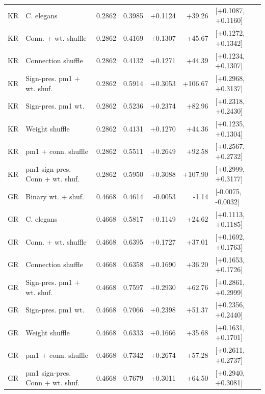 \begin{tabular}{llrrrrl}
KR & C. elegans & 0.2862 & 0.3985 & +0.1124 & +39.26 & [+0.1087, +0.1160] \\
KR & Conn. + wt. shuffle & 0.2862 & 0.4169 & +0.1307 & +45.67 & [+0.1272, +0.1342] \\
KR & Connection shuffle & 0.2862 & 0.4132 & +0.1271 & +44.39 & [+0.1234, +0.1307] \\
KR & Sign-pres. pm1 + wt. shuf. & 0.2862 & 0.5914 & +0.3053 & +106.67 & [+0.2968, +0.3137] \\
KR & Sign-pres. pm1 wt. & 0.2862 & 0.5236 & +0.2374 & +82.96 & [+0.2318, +0.2430] \\
KR & Weight shuffle & 0.2862 & 0.4131 & +0.1270 & +44.36 & [+0.1235, +0.1304] \\
KR & pm1 + conn. shuffle & 0.2862 & 0.5511 & +0.2649 & +92.58 & [+0.2567, +0.2732] \\
KR & pm1 sign-pres. Conn + wt. shuf. & 0.2862 & 0.5950 & +0.3088 & +107.90 & [+0.2999, +0.3177] \\
GR & Binary wt. + shuf. & 0.4668 & 0.4614 & -0.0053 & -1.14 & [-0.0075, -0.0032] \\
GR & C. elegans & 0.4668 & 0.5817 & +0.1149 & +24.62 & [+0.1113, +0.1185] \\
GR & Conn. + wt. shuffle & 0.4668 & 0.6395 & +0.1727 & +37.01 & [+0.1692, +0.1763] \\
GR & Connection shuffle & 0.4668 & 0.6358 & +0.1690 & +36.20 & [+0.1653, +0.1726] \\
GR & Sign-pres. pm1 + wt. shuf. & 0.4668 & 0.7597 & +0.2930 & +62.76 & [+0.2861, +0.2999] \\
GR & Sign-pres. pm1 wt. & 0.4668 & 0.7066 & +0.2398 & +51.37 & [+0.2356, +0.2440] \\
GR & Weight shuffle & 0.4668 & 0.6333 & +0.1666 & +35.68 & [+0.1631, +0.1701] \\
GR & pm1 + conn. shuffle & 0.4668 & 0.7342 & +0.2674 & +57.28 & [+0.2611, +0.2737] \\
GR & pm1 sign-pres. Conn + wt. shuf. & 0.4668 & 0.7679 & +0.3011 & +64.50 & [+0.2940, +0.3081] \\
\bottomrule
\end{tabular}
